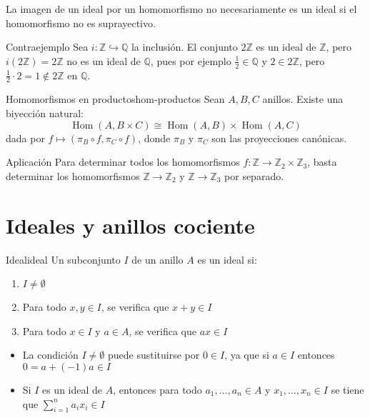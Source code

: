 \begin{remark}
    La imagen de un ideal por un homomorfismo no necesariamente es un ideal si el homomorfismo no es suprayectivo.
\end{remark}

\begin{example}{Contraejemplo}{}
    Sea \(i: \mathbb{Z} \hookrightarrow \mathbb{Q}\) la inclusión. El conjunto \(2\mathbb{Z}\) es un ideal de \(\mathbb{Z}\), pero \(i(2\mathbb{Z}) = 2\mathbb{Z}\) no es un ideal de \(\mathbb{Q}\), pues por ejemplo \(\frac{1}{2} \in \mathbb{Q}\) y \(2 \in 2\mathbb{Z}\), pero \(\frac{1}{2} \cdot 2 = 1 \notin 2\mathbb{Z}\) en \(\mathbb{Q}\).
\end{example}

\begin{theorem}{Homomorfismos en productos}{hom-productos}
    Sean \(A, B, C\) anillos. Existe una biyección natural:
    \[
    \operatorname{Hom}(A, B \times C) \cong \operatorname{Hom}(A, B) \times \operatorname{Hom}(A, C)
    \]
    dada por \(f \mapsto (\pi_B \circ f, \pi_C \circ f)\), donde \(\pi_B\) y \(\pi_C\) son las proyecciones canónicas.
\end{theorem}

\begin{example}{Aplicación}{}
    Para determinar todos los homomorfismos \(f: \mathbb{Z} \to \mathbb{Z}_2 \times \mathbb{Z}_3\), basta determinar los homomorfismos \(\mathbb{Z} \to \mathbb{Z}_2\) y \(\mathbb{Z} \to \mathbb{Z}_3\) por separado.
\end{example}

\clearpage
\section{Ideales y anillos cociente}

\begin{definition}{Ideal}{ideal}
    Un subconjunto \(I\) de un anillo \(A\) es un {ideal} si:
    \begin{enumerate}
        \item \(I \neq \emptyset\)
        \item Para todo \(x, y \in I\), se verifica que \(x + y \in I\)
        \item Para todo \(x \in I\) y \(a \in A\), se verifica que \(ax \in I\)
    \end{enumerate}
\end{definition}

\begin{remark}
    \begin{itemize}
        \item La condición \(I \neq \emptyset\) puede sustituirse por \(0 \in I\), ya que si \(a \in I\) entonces \(0 = a + (-1)a \in I\)
        \item Si \(I\) es un ideal de \(A\), entonces para todo \(a_1, \ldots, a_n \in A\) y \(x_1, \ldots, x_n \in I\) se tiene que \(\sum_{i=1}^n a_i x_i \in I\)
    \end{itemize}
\end{remark}


